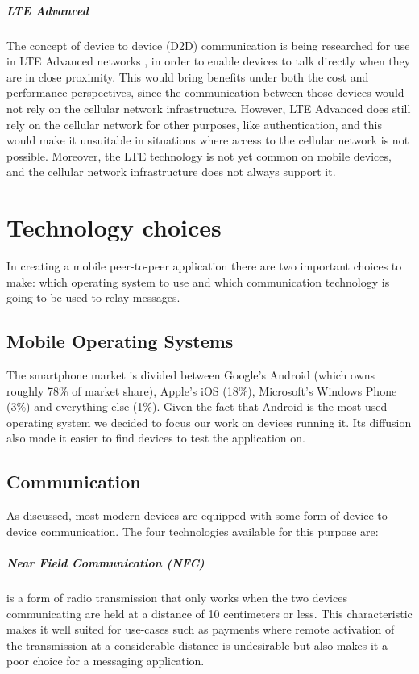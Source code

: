 \paragraph{LTE Advanced} The concept of device to device (D2D) communication is being researched for use in LTE Advanced networks \cite{lte_advanced}, in order to enable devices to talk directly when they are in close proximity.
This would bring benefits under both the cost and performance perspectives, since the communication between those devices would not rely on the cellular network infrastructure.
However, LTE Advanced does still rely on the cellular network for other purposes, like authentication, and this would make it unsuitable in situations where access to the cellular network is not possible.
Moreover, the LTE technology is not yet common on mobile devices, and the cellular network infrastructure does not always support it.

\chapter{Technology choices}
In creating a mobile peer-to-peer application there are two important choices to make: which operating system to use and which communication technology is going to be used to relay messages.

\section{Mobile Operating Systems}
The smartphone market is divided between Google's Android (which owns roughly 78\% of market share), Apple's iOS (18\%), Microsoft's Windows Phone (3\%) and everything else (1\%).
Given the fact that Android is the most used operating system we decided to focus our work on devices running it.
Its diffusion also made it easier to find devices to test the application on.

\section{Communication}
As discussed, most modern devices are equipped with some form of device-to-device communication.
The four technologies available for this purpose are:

\paragraph{Near Field Communication (NFC)}
is a form of radio transmission that only works when the two devices communicating are held at a distance of 10 centimeters or less. 
This characteristic makes it well suited for use-cases such as payments where remote activation of the transmission at a considerable distance is undesirable but also makes it a poor choice for a messaging application.

